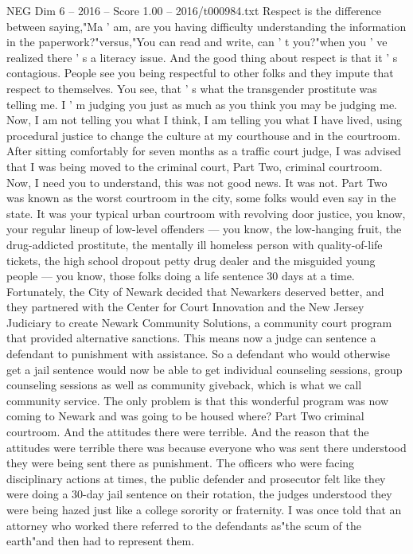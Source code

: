 \begin{textsample}{NEG Dim 6 – 2016 – Score 1.00 – 2016/t000984.txt}
Respect is the difference between saying,"Ma ' am, are you having difficulty understanding the information in the paperwork?"versus,"You can read and write, can ' t you?"when you ' ve realized there ' s a literacy issue.
And the good thing about respect is that it ' s contagious.
People see you being respectful to other folks and they impute that respect to themselves.
You see, that ' s what the transgender prostitute was telling me.
I ' m judging you just as much as you think you may be judging me.
Now, I am not telling you what I think, I am telling you what I have lived, using procedural justice to change the culture at my courthouse and in the courtroom.
After sitting comfortably for seven months as a traffic court judge, I was advised that I was being moved to the criminal court, Part Two, criminal courtroom.
Now, I need you to understand, this was not good news.
It was not.
Part Two was known as the worst courtroom in the city, some folks would even say in the state.
It was your typical urban courtroom with revolving door justice, you know, your regular lineup of low-level offenders — you know, the low-hanging fruit, the drug-addicted prostitute, the mentally ill homeless person with quality-of-life tickets, the high school dropout petty drug dealer and the misguided young people — you know, those folks doing a life sentence 30 days at a time.
Fortunately, the City of Newark decided that Newarkers deserved better, and they partnered with the Center for Court Innovation and the New Jersey Judiciary to create Newark Community Solutions, a community court program that provided alternative sanctions.
This means now a judge can sentence a defendant to punishment with assistance.
So a defendant who would otherwise get a jail sentence would now be able to get individual counseling sessions, group counseling sessions as well as community giveback, which is what we call community service.
The only problem is that this wonderful program was now coming to Newark and was going to be housed where?
Part Two criminal courtroom.
And the attitudes there were terrible.
And the reason that the attitudes were terrible there was because everyone who was sent there understood they were being sent there as punishment.
The officers who were facing disciplinary actions at times, the public defender and prosecutor felt like they were doing a 30-day jail sentence on their rotation, the judges understood they were being hazed just like a college sorority or fraternity.
I was once told that an attorney who worked there referred to the defendants as"the scum of the earth"and then had to represent them.

\end{textsample}
